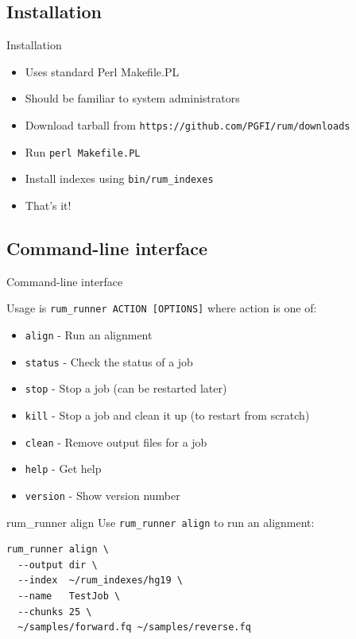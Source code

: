 \documentclass{beamer}
\begin{document}
\subsection{Installation}

\begin{frame}{Installation}
  \begin{itemize}
  \item Uses standard Perl Makefile.PL
  \item Should be familiar to system administrators
  \item Download tarball from \texttt{https://github.com/PGFI/rum/downloads}
  \item Run \texttt{perl Makefile.PL}
  \item Install indexes using \texttt{bin/rum\_indexes}
  \item That's it!
  \end{itemize}
\end{frame}

\subsection{Command-line interface}

\begin{frame}{Command-line interface}

  Usage is \texttt{rum\_runner ACTION [OPTIONS]} where action is one of:

  \begin{itemize}
  \item \texttt{align} - Run an alignment
  \item \texttt{status} - Check the status of a job
  \item \texttt{stop} - Stop a job (can be restarted later)
  \item \texttt{kill} - Stop a job and clean it up (to restart from scratch)
  \item \texttt{clean} - Remove output files for a job
  \item \texttt{help} - Get help
  \item \texttt{version} - Show version number
  \end{itemize}

\end{frame}


\begin{frame}[fragile]{rum\_runner align}
Use \texttt{rum\_runner align} to run an alignment:
\begin{verbatim}
rum_runner align \
  --output dir \
  --index  ~/rum_indexes/hg19 \
  --name   TestJob \
  --chunks 25 \
  ~/samples/forward.fq ~/samples/reverse.fq
\end{verbatim}
\end{frame}
\end{document}
